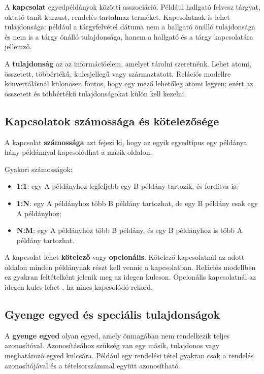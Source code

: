 A \textbf{kapcsolat} egyedpéldányok közötti asszociáció. Például hallgató felvesz tárgyat, oktató tanít kurzust, rendelés tartalmaz terméket. Kapcsolatnak is lehet tulajdonsága: például a tárgyfelvétel dátuma nem a hallgató önálló tulajdonsága és nem is a tárgy önálló tulajdonsága, hanem a hallgató és a tárgy kapcsolatára jellemző.

A \textbf{tulajdonság} az az információelem, amelyet tárolni szeretnénk. Lehet atomi, összetett, többértékű, kulcsjellegű vagy származtatott. Relációs modellre konvertálásnál különösen fontos, hogy egy mező lehetőleg atomi legyen; ezért az összetett és többértékű tulajdonságokat külön kell kezelni.



\subsection{Kapcsolatok számossága és kötelezősége}

A kapcsolat \textbf{számossága} azt fejezi ki, hogy az egyik egyedtípus egy példánya hány példánnyal kapcsolódhat a másik oldalon.

Gyakori számosságok:

\begin{itemize}
  \item \textbf{1:1}: egy A példányhoz legfeljebb egy B példány tartozik, és fordítva is;
  \item \textbf{1:N}: egy A példányhoz több B példány tartozhat, de egy B példány csak egy A példányhoz;
  \item \textbf{N:M}: egy A példányhoz több B példány, és egy B példányhoz is több A példány tartozhat.
\end{itemize}

A kapcsolat lehet \textbf{kötelező} vagy \textbf{opcionális}. Kötelező kapcsolatnál az adott oldalon minden példánynak részt kell vennie a kapcsolatban. Relációs modellben ez gyakran  feltételként jelenik meg az idegen kulcson. Opcionális kapcsolatnál az idegen kulcs lehet , ha nincs kapcsolódó rekord.

\subsection{Gyenge egyed és speciális tulajdonságok}

A \textbf{gyenge egyed} olyan egyed, amely önmagában nem rendelkezik teljes azonosítóval. Azonosításához szükség van egy másik, tulajdonos vagy meghatározó egyed kulcsára. Például egy rendelési tétel gyakran csak a rendelés azonosítójával és a tételsorszámmal együtt azonosítható.

